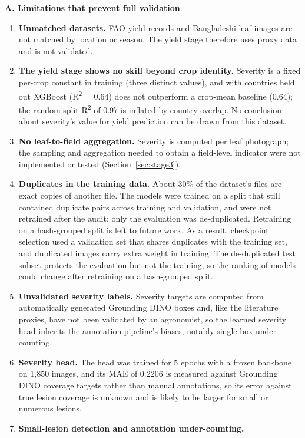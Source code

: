 \textbf{A. Limitations that prevent full validation}
\begin{enumerate}[noitemsep]
  \item \textbf{Unmatched datasets.} FAO yield records and Bangladeshi
    leaf images are not matched by location or season. The yield stage
    therefore uses proxy data and is not validated.
  \item \textbf{The yield stage shows no skill beyond crop identity.}
    Severity is a fixed per-crop constant in training (three distinct
    values), and with countries held out XGBoost
    (R\textsuperscript{2} = 0.64) does not outperform a crop-mean
    baseline (0.64); the random-split R\textsuperscript{2} of 0.97 is
    inflated by country overlap. No conclusion about severity's value
    for yield prediction can be drawn from this dataset.
  \item \textbf{No leaf-to-field aggregation.} Severity is computed
    per leaf photograph; the sampling and aggregation needed to obtain
    a field-level indicator were not implemented or tested
    (Section~\ref{sec:stage3}).
  \item \textbf{Duplicates in the training data.} About 30\% of the dataset's files are exact copies of another file. The models were trained on a split that still contained duplicate pairs across training and validation, and were not retrained after the audit; only the evaluation was de-duplicated. Retraining on a hash-grouped split is left to future work. As a result, checkpoint selection used a validation set that shares duplicates with the training set, and duplicated images carry extra weight in training. The de-duplicated test subset protects the evaluation but not the training, so the ranking of models could change after retraining on a hash-grouped split.
  \item \textbf{Unvalidated severity labels.} Severity targets are
    computed from automatically generated Grounding DINO boxes and, like
    the literature proxies, have not been validated by an agronomist, so
    the learned severity head inherits the annotation pipeline's biases,
    notably single-box under-counting.
  \item \textbf{Severity head.} The head was trained for 5 epochs with
    a frozen backbone on 1,850 images, and its MAE of 0.2206 is measured
    against Grounding DINO coverage targets rather than manual
    annotations, so its error against true lesion coverage is unknown
    and is likely to be larger for small or numerous lesions.
  \item \textbf{Small-lesion detection and annotation under-counting.}

\end{enumerate}
